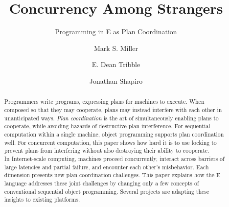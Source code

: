 \documentclass{llncs}
\begin{document}
\newcommand{\name}[1]{{\sf\textsl{#1}}}        %
\newcommand{\vat}[1]{{\sf Vat{#1}}}            %
\newcommand{\pr}[1]{{#1}}                      %
\newcommand{\code}[1]{{\tt {#1}}}              %
\newcommand{\var}[1]{{\tt {#1}}}               %
\newcommand{\dvar}[1]{{\textsl{#1}}}           %
\newcommand{\dobj}[1]{{\textsl{#1}}}           %
\newcommand{\meth}[1]{{\tt {#1}}}              %
\newcommand{\dmeth}[1]{{\tt {#1}}}             %
\newcommand{\cls}[1]{{\tt {#1}}}               %
\newcommand{\ex}[1]{{\tt {#1}}}                %
\newcommand{\abst}[1]{{#1}}                    %
\newcommand{\sys}[1]{{#1}}                     %

\newcommand{\related}[1]{\vspace{3pt}\textbf{{#1}}}

\def\twiddle{\raisebox{0.3ex}{\mbox{\tiny $\sim$}}}


\title{Concurrency Among Strangers}
\subtitle{Programming in E as Plan Coordination}

\author{Mark S. Miller \and 
  E. Dean Tribble \and
  Jonathan Shapiro}


\maketitle

\sloppypar

\begin{abstract}
Programmers write programs, expressing plans for machines to
execute. When composed so that they may cooperate, plans may instead
interfere with each other in unanticipated ways. \emph{Plan
coordination} is the art of simultaneously enabling plans to
cooperate, while avoiding hazards of destructive plan
interference. For sequential computation within a single machine,
object programming supports plan coordination well. For concurrent
computation, this paper shows how hard it is to use locking to prevent
plans from interfering without also destroying their ability to
cooperate.\\

In Internet-scale computing, machines proceed concurrently, interact
across barriers of large latencies and partial failure, and encounter
each other's misbehavior. Each dimension presents new plan
coordination challenges. This paper explains how the E language
addresses these joint challenges by changing only a few concepts of
conventional sequential object programming. Several projects are
adapting these insights to existing platforms.
\end{abstract}
\end{document}
